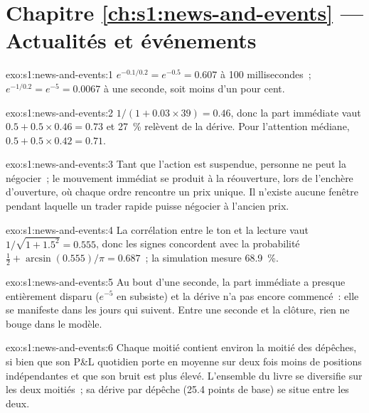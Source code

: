 \section*{Chapitre \ref{ch:s1:news-and-events} --- Actualités et événements}

\begin{solution}{exo:s1:news-and-events:1}
$e^{-0.1/0.2} = e^{-0.5} = 0.607$ à 100 millisecondes~; $e^{-1/0.2} = e^{-5} = 0.0067$ à une seconde, soit moins d'un pour cent.
\end{solution}

\begin{solution}{exo:s1:news-and-events:2}
$1/(1 + 0.03 \times 39) = 0.46$, donc la part immédiate vaut $0.5 + 0.5 \times 0.46 = 0.73$ et 27~\% relèvent de la dérive. Pour l'attention médiane, $0.5 + 0.5 \times 0.42
= 0.71$.
\end{solution}

\begin{solution}{exo:s1:news-and-events:3}
Tant que l'action est suspendue, personne ne peut la négocier~; le mouvement immédiat se produit à la réouverture, lors de l'enchère d'ouverture, où chaque ordre rencontre un prix unique. Il n'existe
aucune fenêtre pendant laquelle un trader rapide puisse négocier à l'ancien prix.
\end{solution}

\begin{solution}{exo:s1:news-and-events:4}
La corrélation entre le ton et la lecture vaut $1/\sqrt{1 + 1.5^2} = 0.555$, donc les signes concordent avec la probabilité $\tfrac12 + \arcsin(0.555)/\pi = 0.687$~;
la simulation mesure 68.9~\%.
\end{solution}

\begin{solution}{exo:s1:news-and-events:5}
Au bout d'une seconde, la part immédiate a presque entièrement disparu ($e^{-5}$ en subsiste) et la dérive n'a pas encore commencé~: elle se manifeste dans les jours qui suivent.
Entre une seconde et la clôture, rien ne bouge dans le modèle.
\end{solution}

\begin{solution}{exo:s1:news-and-events:6}
Chaque moitié contient environ la moitié des dépêches, si bien que son P\&L quotidien porte en moyenne sur deux fois moins de positions indépendantes et que son bruit est plus élevé. L'ensemble du livre
se diversifie sur les deux moitiés~; sa dérive par dépêche (25.4 points de base) se situe entre les deux.
\end{solution}

